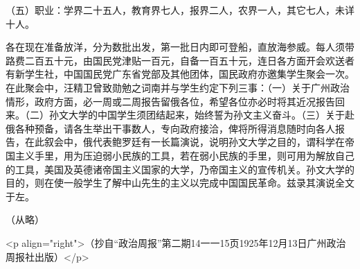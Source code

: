 （五）职业：学界二十五人，教育界七人，报界二人，农界一人，其它七人，未详十人。

各在现在准备放洋，分为数批出发，第一批日内即可登船，直放海参威。每人须带路费二百五十元，由国民党津贴一百元，自备一百五十元，连日各方面开会欢送者有新学生社，中国国民党广东省党部及其他团体，国民政府亦邀集学生聚会一次。在此聚会中，汪精卫曾致勋勉之词南并与学生约定下列三事：（一）关于广州政治情形，政府方面，必一周或二周报告留俄各位，希望各位亦必时将其近况报告回来。（二）孙文大学的中国学生须团结起来，始终誓为孙文主义奋斗。（三）关于赴俄各种预备，请各生举出干事数人，专向政府接洽，俾将所得消息随时向各人报告，在此叙会中，俄代表鲍罗廷有一长篇演说，说明孙文大学之目的，谓科学在帝国主义手里，用为压迫弱小民族的工具，若在弱小民族的手里，则可用为解放自己的工具，美国及英德诸帝国主义国家的大学，乃帝国主义的宣传机关。孙文大学的目的，则在使一般学生了解中山先生的主义以完成中国国民革命。兹录其演说全文于左。

（从略）

<p align="right">（抄自“政治周报”第二期14一一15页1925年12月13日广州政治周报社出版）</p>

